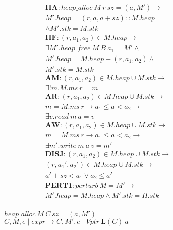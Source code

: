 \documentclass{article}
\begin{document}
\begin{figure}
  \begin{minipage}[t]{0.4\textwidth}
    \[\begin{aligned}
    \mathbf{HA} :
    \mathit{heap\_alloc} ~ M ~ r ~ sz = (a, M') \rightarrow & \\
    M'.heap = (r,a,a+sz)::M.heap & \\
    \land M'.stk = M.stk & \\[0.75em]
    \mathbf{HF} : (r,a_1,a_2) \in M.heap \rightarrow & \\
    \exists M' . \mathit{heap\_free} ~ M ~ B ~ a_1 = M' \land & \\
    M'.heap = M.heap-(r,a_1,a_2) \land & \\
    M'.stk = M.stk & \\[0.75em]
    \mathbf{AM} : (r,a_1,a_2) \in M.heap \cup M.stk \rightarrow & \\
    \exists ! m . M.ms ~ r = m & \\[0.75em]
    \mathbf{AR} : (r,a_1,a_2) \in M.heap \cup M.stk \rightarrow & \\
    m = M.ms ~ r \rightarrow a_1 \leq a < a_2 \rightarrow & \\
    \exists v . \mathit{read} ~ m ~ a = v & \\[0.75em]
    \mathbf{AW} : (r,a_1,a_2) \in M.heap \cup M.stk \rightarrow & \\
    m = M.ms ~ r \rightarrow a_1 \leq a < a_2 \rightarrow & \\
    \exists m' . \mathit{write} ~ m ~ a ~ v = m' & \\[0.75em]
     \mathbf{DISJ} : (r,a_1,a_2) \in M.heap \cup M.stk \rightarrow & \\
    (r,a_1',a_2') \in M.heap \cup M.stk \rightarrow & \\
    a'+sz < a_1 \lor a_2 \leq a' & \\[0.75em]
    \mathbf{PERT1} : \mathit{perturb} ~ M = M' \rightarrow & \\
    M'.heap = M.heap \land M'.stk = H.stk \\[0.75em]
 \end{aligned}\]
  \end{minipage}
  \begin{minipage}[t]{0.65\textwidth}
             {\(\mathit{heap\_alloc} ~ M ~ C ~ sz = (a, M')\)}
             {\(C,M,e\mid \mathit{expr} \longrightarrow
               C,M',e \mid \mathit{Vptr} ~ \mathbf{L}(C) ~ a\)}


\end{minipage}
\end{figure}
\end{document}
